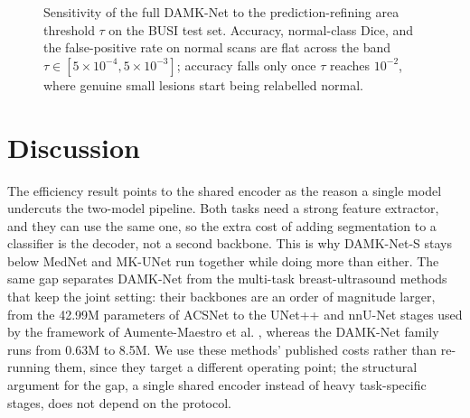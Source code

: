 \documentclass[runningheads]{llncs}
\begin{document}
\begin{figure}[t]
\centering
{}
\caption{Sensitivity of the full DAMK-Net to the prediction-refining area
threshold $\tau$ on the BUSI test set. Accuracy, normal-class Dice, and the
false-positive rate on normal scans are flat across the band
$\tau\in[5{\times}10^{-4},5{\times}10^{-3}]$; accuracy falls only once $\tau$
reaches $10^{-2}$, where genuine small lesions start being relabelled normal.}
\label{fig:tau}
\end{figure}

\section{Discussion}
The efficiency result points to the shared encoder as the reason a single model
undercuts the two-model pipeline. Both tasks need a strong feature extractor, and
they can use the same one, so the extra cost of adding segmentation to a
classifier is the decoder, not a second backbone. This is why DAMK-Net-S stays
below MedNet and MK-UNet run together while doing more than either. The same gap
separates DAMK-Net from the multi-task breast-ultrasound methods that keep the
joint setting: their backbones are an order of magnitude larger, from the 42.99M
parameters of ACSNet \cite{ACSNet} to the UNet++ and nnU-Net stages used by the
framework of Aumente-Maestro et al. \cite{CMPB}, whereas the DAMK-Net family runs
from 0.63M to 8.5M. We use these methods' published costs rather than re-running
them, since they target a different operating point; the structural argument for
the gap, a single shared encoder instead of heavy task-specific stages, does not
depend on the protocol.
\end{document}
